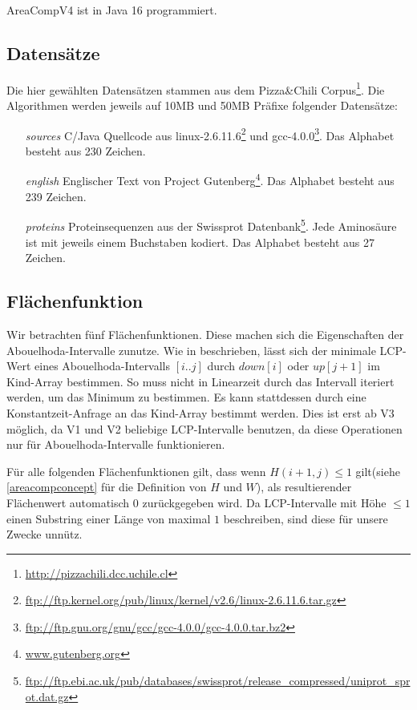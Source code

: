 AreaCompV4 ist in Java 16 programmiert.

\subsection{Datensätze}

Die hier gewählten Datensätzen stammen aus dem Pizza\&Chili Corpus\footnote{\url{http://pizzachili.dcc.uchile.cl}}. Die Algorithmen werden jeweils auf 10MB und 50MB Präfixe folgender Datensätze:

\begin{itemize}
    \item[\emph{sources}] C/Java Quellcode aus linux-2.6.11.6\footnote{\url{ftp://ftp.kernel.org/pub/linux/kernel/v2.6/linux-2.6.11.6.tar.gz}} und gcc-4.0.0\footnote{\url{ftp://ftp.gnu.org/gnu/gcc/gcc-4.0.0/gcc-4.0.0.tar.bz2}}. Das Alphabet besteht aus 230 Zeichen.
    \item[\emph{english}] Englischer Text von Project Gutenberg\footnote{\url{	www.gutenberg.org}}. Das Alphabet besteht aus 239 Zeichen.
    \item[\emph{proteins}] Proteinsequenzen aus der Swissprot Datenbank\footnote{\url{ftp://ftp.ebi.ac.uk/pub/databases/swissprot/release_compressed/uniprot_sprot.dat.gz}}. Jede Aminosäure ist mit jeweils einem Buchstaben kodiert. Das Alphabet besteht aus 27 Zeichen.
\end{itemize}

\subsection{Flächenfunktion}

Wir betrachten fünf Flächenfunktionen. Diese machen sich die Eigenschaften der Abouelhoda-Intervalle zunutze. 
Wie in \cite{abouelhoda_optimal_2002} beschrieben, lässt sich der minimale LCP-Wert eines Abouelhoda-Intervalls $[i..j]$ durch $down[i]$ oder $up[j+1]$ im Kind-Array bestimmen. 
So muss nicht in Linearzeit durch das Intervall iteriert werden, um das Minimum zu bestimmen. Es kann stattdessen durch eine Konstantzeit-Anfrage an das Kind-Array bestimmt werden. Dies ist erst ab V3 möglich, da V1 und V2 beliebige LCP-Intervalle benutzen, da diese Operationen nur für Abouelhoda-Intervalle funktionieren.

Für alle folgenden Flächenfunktionen gilt, dass wenn $H(i+1, j) \leq 1$ gilt(siehe \autoref{areacompconcept} für die Definition von $H$ und $W$), als resultierender Flächenwert automatisch $0$ zurückgegeben wird. Da LCP-Intervalle mit Höhe $\leq 1$ einen Substring einer Länge von maximal $1$ beschreiben, sind diese für unsere Zwecke unnütz.  

